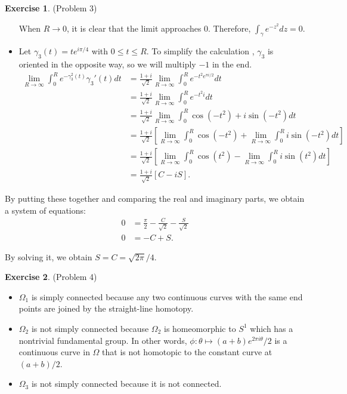 \documentclass[12pt, psamsfonts]{amsart}
\theoremstyle{definition}
\newtheorem*{exer}{Exercise}
\theoremstyle{remark}
\numberwithin{equation}{section}
\begin{document}
\begin{exer}{(Problem 3)}
\begin{itemize}
      When $R \rightarrow 0$, it is clear that the limit approaches 0.
      Therefore, $\int_{\gamma} e^{-z^2} dz = 0$.
    \item
      Let $\gamma_3(t) = te^{i\pi / 4}$ with $0 \leq t \leq R$.
      To simplify the calculation , $\gamma_3$ is oriented in the opposite way, so we will multiply $-1$ in the end.
      \begin{align*}
        \lim_{R \rightarrow \infty} \int_0^R e^{-\gamma_3^2(t)}\gamma_3'(t) dt
          &= \frac{1 + i}{\sqrt{2}} \lim_{R \rightarrow \infty} \int_0^R e^{-t^2e^{\pi i / 2}} dt \\
          &= \frac{1 + i}{\sqrt{2}} \lim_{R \rightarrow \infty} \int_0^R e^{-t^2i} dt \\
          &= \frac{1 + i}{\sqrt{2}} \lim_{R \rightarrow \infty} \int_0^R \cos(-t^2) + i\sin(-t^2) dt \\
          &= \frac{1 + i}{\sqrt{2}} [\lim_{R \rightarrow \infty} \int_0^R \cos(-t^2) + \lim_{R \rightarrow \infty} \int_0^R i\sin(-t^2) dt] \\
          &= \frac{1 + i}{\sqrt{2}} [\lim_{R \rightarrow \infty} \int_0^R \cos(t^2) - \lim_{R \rightarrow \infty} \int_0^R i\sin(t^2) dt] \\
          &= \frac{1 + i}{\sqrt{2}} [C - iS].
      \end{align*}
  \end{itemize}
  By putting these together and comparing the real and imaginary parts, we obtain a system of equations:
  \begin{align*}
    0 &= \frac{\pi}{2} - \frac{C}{\sqrt{2}} - \frac{S}{\sqrt{2}} \\
    0 &= -C + S.
  \end{align*}

  By solving it, we obtain $S = C = \sqrt{2\pi} / 4$.
\end{exer}

\begin{exer}{(Problem 4)}
  \begin{itemize}
    \item
      $\Omega_1$ is simply connected because any two continuous curves with the same end points are joined by the straight-line homotopy.
    \item
      $\Omega_2$ is not simply connected because $\Omega_2$ is homeomorphic to $S^1$ which has a nontrivial fundamental group.
      In other words, $\phi: \theta \mapsto (a + b)e^{2\pi i\theta}/2$ is a continuous curve in $\Omega$ that is not homotopic to the constant curve at $(a + b) / 2$.
    \item
      $\Omega_3$ is not simply connected because it is not connected.
  \end{itemize}
\end{exer}
\end{document}
